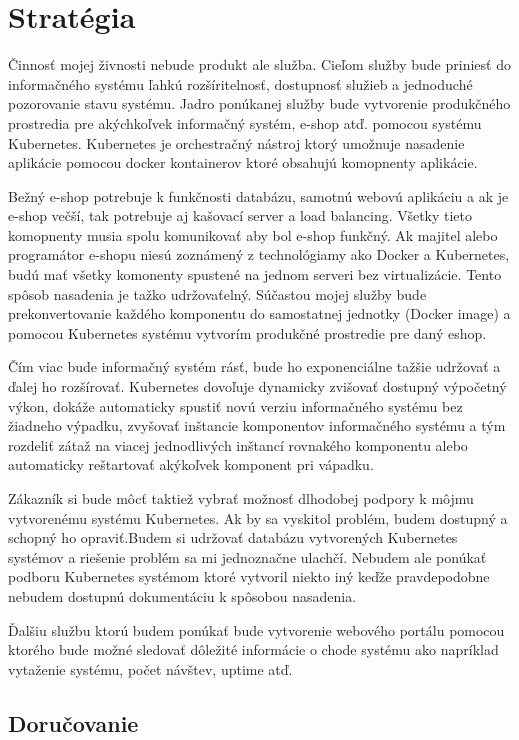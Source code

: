 \chapter{Stratégia}

Činnosť mojej živnosti nebude produkt ale služba. Cieľom služby bude priniesť do informačného systému ľahkú rozšíritelnosť, dostupnosť služieb a jednoduché pozorovanie stavu systému. Jadro ponúkanej služby bude vytvorenie produkčného prostredia pre akýchkoľvek informačný systém, e-shop atď. pomocou systému Kubernetes. Kubernetes je orchestračný nástroj ktorý umožnuje nasadenie aplikácie pomocou docker kontainerov ktoré obsahujú komopnenty aplikácie. 

Bežný e-shop potrebuje k funkčnosti databázu, samotnú webovú aplikáciu a ak je e-shop večší, tak potrebuje aj kašovací server a load balancing. Všetky tieto komopnenty musia spolu komunikovať aby bol e-shop funkčný. Ak majitel alebo programátor e-shopu niesú zoznámený z technológiamy ako Docker a Kubernetes, budú mať všetky komonenty spustené na jednom serveri bez virtualizácie. Tento spôsob nasadenia je tažko udržovaťelný. Súčastou mojej služby bude prekonvertovanie každého komponentu do samostatnej jednotky (Docker image) a pomocou Kubernetes systému vytvorím produkčné prostredie pre daný eshop.

Čím viac bude informačný systém rásť, bude ho exponenciálne tažšie udržovať a ďalej ho rozšírovať. Kubernetes dovoľuje dynamicky zvišovať dostupný výpočetný výkon, dokáže automaticky spustiť novú verziu informačného systému bez žiadneho výpadku, zvyšovať inštancie komponentov informačného systému a tým rozdeliť zátaž na viacej jednodlivých inštancí rovnakého komponentu alebo automaticky reštartovať akýkoľvek komponent pri vápadku. 

Zákazník si bude môcť taktiež vybrať možnosť dlhodobej podpory k môjmu vytvorenému systému Kubernetes. Ak by sa vyskitol problém, budem dostupný a schopný ho opraviť.Budem si udržovať databázu vytvorených Kubernetes systémov a riešenie problém sa mi jednoznačne ulachčí. Nebudem ale ponúkať podboru Kubernetes systémom ktoré vytvoril niekto iný keďže pravdepodobne nebudem dostupnú dokumentáciu k spôsobou nasadenia.

Ďalšiu službu ktorú budem ponúkať bude vytvorenie webového portálu pomocou ktorého bude možné sledovať dôležité informácie o chode systému ako napríklad vytaženie systému, počet návštev, uptime atď.


\section{Doručovanie}

